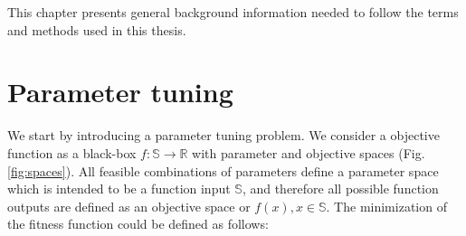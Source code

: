 
    This chapter presents general background information needed to follow the terms and methods used in this thesis. 

    \section{Parameter tuning}
        We start by introducing a parameter tuning problem. We consider a objective function as a black-box $f : \mathbb{S} \rightarrow \mathbb{R}$ with parameter and objective spaces (Fig. \ref{fig:spaces}). All feasible combinations of parameters define a parameter space which is intended to be a function input $\mathbb{S}$, and therefore all possible function outputs are defined as an objective space or $f(x), x \in \mathbb{S}$. The minimization of the fitness function could be defined as follows:

